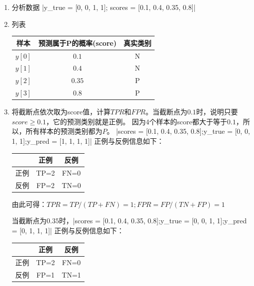 \begin{enumerate}\itemsep0em 
		\item 分析数据 \li|y_true = [0, 0, 1, 1]; scores = [0.1, 0.4, 0.35, 0.8]|
		\item 列表

			\begin{table}[h]
				\centering
				\begin{tabular}{|c|c|c|}\hline
					样本 & 预测属于P的概率(score) & 真实类别 \\\hline
					$y[0]$ & $0.1 $                  & N       \\\hline 
					$y[1]$ & $0.4 $                  & N       \\\hline 
					$y[2]$ & $0.35$                  & P       \\\hline 
					$y[3]$ & $0.8 $                  & P       \\\hline 
				\end{tabular}
			\end{table}

		\item 将截断点依次取为score值，计算$TPR$和$FPR$。当截断点为$0.1$时，说明只要$score\ge 0.1$，它的预测类别就是正例。 因为$4$个样本的score都大于等于$0.1$，所以，所有样本的预测类别都为$P$。 \li|scores = [0.1, 0.4, 0.35, 0.8];y_true = [0, 0, 1, 1];y_pred = [1, 1, 1, 1]| 正例与反例信息如下：

			\begin{table}[h]
				\centering
				\begin{tabular}{|c|c|c|}\hline
					& 正例 & 反例 \\\hline
					正例  & TP=2 & FN=0\\\hline 
					反例  & FP=2 & TN=0\\\hline 
				\end{tabular}
			\end{table}

		由此可得：$ TPR = TP/(TP+FN) = 1; FPR = FP/(TN+FP) = 1$


		当截断点为$0.35$时，\li|scores = [0.1, 0.4, 0.35, 0.8];y_true = [0, 0, 1, 1];y_pred = [0, 1, 1, 1]| 正例与反例信息如下：

			\begin{table}[h]
				\centering
				\begin{tabular}{|c|c|c|}\hline
					& 正例 & 反例 \\\hline
					正例  & TP=2 & FN=0\\\hline 
					反例  & FP=1 & TN=1\\\hline 
				\end{tabular}
			\end{table}


\end{enumerate}
